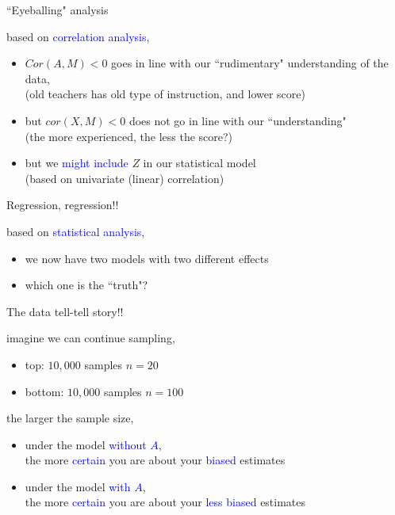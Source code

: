 %
%
\begin{lhframe}[rhgraphic={\texttt{[image: descendant1\_panel.pdf]}}]
	{``Eyeballing" analysis}
	
	based on \textcolor{blue}{correlation analysis},
	\begin{itemize}
		\item $Cor(A,M)<0$ goes in line with our ``rudimentary" understanding of the data, \\
		{\small (old teachers has old type of instruction, and lower score)}
		\item but $cor(X, M)<0$ does not go in line with our ``understanding"\\
		{\small (the more experienced, the less the score?)}
		\item but we \textcolor{blue}{might include} $Z$ in our statistical model \\
		{\small (based on univariate (linear) correlation)}
	\end{itemize}
\end{lhframe}
%
%
\begin{lhframe}[rhgraphic={\texttt{[image: descendant1\_reg.png]}}]
	{Regression, regression!!}
	
	based on \textcolor{blue}{statistical analysis},
	\begin{itemize}
		\item we now have two models with two different effects
		\item which one is the ``truth"?
	\end{itemize}
\end{lhframe}
%
%
\begin{lhframe}[rhgraphic={\texttt{[image: descendant1a\_samplesize.pdf]}}]
	{The data tell-tell story!!}
	
	imagine we can continue sampling,
	\begin{itemize}
		\item top: $10,000$ samples $n=20$
		\item bottom: $10,000$ samples $n=100$
	\end{itemize}
	
	the larger the sample size,
	\begin{itemize}
		\item under the model \textcolor{blue}{without $A$}, \\
		the more \textcolor{blue}{certain} you are about your \textcolor{blue}{biased} estimates
		\item under the model \textcolor{blue}{with $A$}, \\
		the more \textcolor{blue}{certain} you are about your \textcolor{blue}{less biased} estimates
	\end{itemize}
\end{lhframe}
